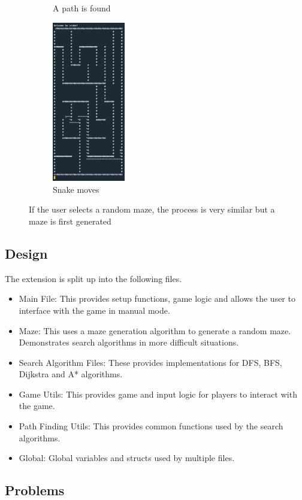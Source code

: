 \documentclass[11pt]{article}
\begin{document}
\begin{figure}[H]
\begin{subfigure}{0.24\textwidth}
    \caption{A path is found}
    \label{fig:subim3}
\end{subfigure}
\begin{subfigure}{0.24\textwidth}
    \includegraphics[height=7cm]{A_Star_Move_Maze}
    \caption{Snake moves}
    \label{fig:subim4}
\end{subfigure}

\caption{If the user selects a random maze, the process is very similar but a maze is first generated}
\label{fig:image3}
\end{figure}

\subsection{Design}

The extension is split up into the following files.
\begin{itemize}
    \item Main File: This provides setup functions, game logic and allows the user to interface with the game in manual mode.
    \item Maze: This uses a maze generation algorithm to generate a random maze. Demonstrates search algorithms in more difficult situations.
    \item Search Algorithm Files: These provides implementations for DFS, BFS, Dijkstra and A* algorithms.
    \item Game Utils: This provides game and input logic for players to interact with the game.
    \item Path Finding Utils: This provides common functions used by the search algorithms.
    \item Global: Global variables and structs used by multiple files.
\end{itemize}

\subsection{Problems}
\end{document}
